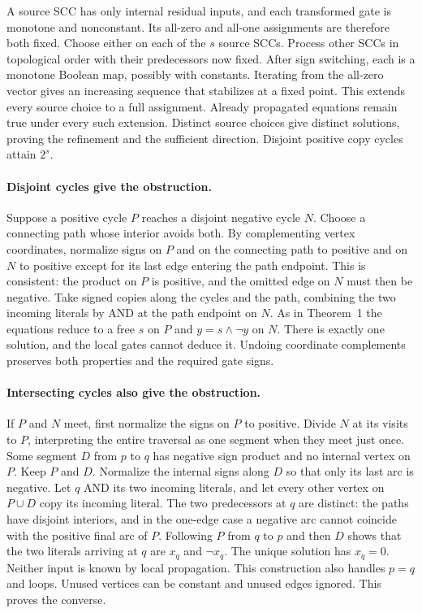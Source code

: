 \documentclass[11pt]{article}
\begin{document}
A source SCC has only internal residual inputs, and each transformed gate is monotone and nonconstant. Its all-zero and all-one assignments are therefore both fixed. Choose either on each of the $s$ source SCCs. Process other SCCs in topological order with their predecessors now fixed. After sign switching, each is a monotone Boolean map, possibly with constants. Iterating from the all-zero vector gives an increasing sequence that stabilizes at a fixed point. This extends every source choice to a full assignment. Already propagated equations remain true under every such extension. Distinct source choices give distinct solutions, proving the refinement and the sufficient direction. Disjoint positive copy cycles attain $2^s$.

\paragraph{Disjoint cycles give the obstruction.}
Suppose a positive cycle $P$ reaches a disjoint negative cycle $N$. Choose a connecting path whose interior avoids both. By complementing vertex coordinates, normalize signs on $P$ and on the connecting path to positive and on $N$ to positive except for its last edge entering the path endpoint. This is consistent: the product on $P$ is positive, and the omitted edge on $N$ must then be negative. Take signed copies along the cycles and the path, combining the two incoming literals by AND at the path endpoint on $N$. As in Theorem~1 the equations reduce to a free $s$ on $P$ and $y=s\land\neg y$ on $N$. There is exactly one solution, and the local gates cannot deduce it. Undoing coordinate complements preserves both properties and the required gate signs.

\paragraph{Intersecting cycles also give the obstruction.}
If $P$ and $N$ meet, first normalize the signs on $P$ to positive. Divide $N$ at its visits to $P$, interpreting the entire traversal as one segment when they meet just once. Some segment $D$ from $p$ to $q$ has negative sign product and no internal vertex on $P$. Keep $P$ and $D$. Normalize the internal signs along $D$ so that only its last arc is negative. Let $q$ AND its two incoming literals, and let every other vertex on $P\cup D$ copy its incoming literal. The two predecessors at $q$ are distinct: the paths have disjoint interiors, and in the one-edge case a negative arc cannot coincide with the positive final arc of $P$. Following $P$ from $q$ to $p$ and then $D$ shows that the two literals arriving at $q$ are $x_q$ and $\neg x_q$. The unique solution has $x_q=0$. Neither input is known by local propagation. This construction also handles $p=q$ and loops. Unused vertices can be constant and unused edges ignored. This proves the converse.
\end{document}
